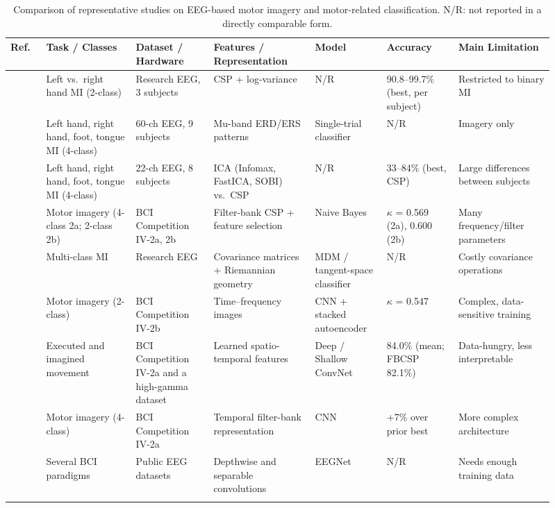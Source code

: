 \documentclass[pdflatex,sn-mathphys-num]{sn-jnl}%
\theoremstyle{thmstyleone}%
\theoremstyle{thmstyletwo}%
\theoremstyle{thmstylethree}%
\begin{document}
\begin{table}[t]
\centering
\caption{Comparison of representative studies on EEG-based motor imagery and motor-related classification. N/R: not reported in a directly comparable form.}
\label{tab:litreview}
\footnotesize
\setlength{\tabcolsep}{2.5pt}
\begin{tabular}{@{}p{0.06\linewidth}p{0.15\linewidth}p{0.13\linewidth}p{0.17\linewidth}p{0.12\linewidth}p{0.12\linewidth}p{0.16\linewidth}@{}}
\toprule
Ref. & Task / Classes & Dataset / Hardware & Features / Representation & Model & Accuracy & Main Limitation \\
\midrule
\cite{Ramoser2000} & Left vs.\ right hand MI (2-class) & Research EEG, 3 subjects & CSP + log-variance & N/R & 90.8--99.7\% (best, per subject) & Restricted to binary MI \\ \addlinespace
\cite{Pfurtscheller2006} & Left hand, right hand, foot, tongue MI (4-class) & 60-ch EEG, 9 subjects & Mu-band ERD/ERS patterns & Single-trial classifier & N/R & Imagery only \\ \addlinespace
\cite{Naeem2006} & Left hand, right hand, foot, tongue MI (4-class) & 22-ch EEG, 8 subjects & ICA (Infomax, FastICA, SOBI) vs.\ CSP & N/R & 33--84\% (best, CSP) & Large differences between subjects \\ \addlinespace
\cite{Ang2012} & Motor imagery (4-class 2a; 2-class 2b) & BCI Competition IV-2a, 2b & Filter-bank CSP + feature selection & Naive Bayes & $\kappa$ = 0.569 (2a), 0.600 (2b) & Many frequency/filter parameters \\ \addlinespace
\cite{Barachant2012} & Multi-class MI & Research EEG & Covariance matrices + Riemannian geometry & MDM / tangent-space classifier & N/R & Costly covariance operations \\ \addlinespace
\cite{Tabar2017} & Motor imagery (2-class) & BCI Competition IV-2b & Time--frequency images & CNN + stacked autoencoder & $\kappa$ = 0.547 & Complex, data-sensitive training \\ \addlinespace
\cite{Schirrmeister2017} & Executed and imagined movement & BCI Competition IV-2a and a high-gamma dataset & Learned spatio-temporal features & Deep / Shallow ConvNet & 84.0\% (mean; FBCSP 82.1\%) & Data-hungry, less interpretable \\ \addlinespace
\cite{Sakhavi2018} & Motor imagery (4-class) & BCI Competition IV-2a & Temporal filter-bank representation & CNN & +7\% over prior best & More complex architecture \\ \addlinespace
\cite{Lawhern2018} & Several BCI paradigms & Public EEG datasets & Depthwise and separable convolutions & EEGNet & N/R & Needs enough training data \\ \addlinespace

\end{tabular}
\end{table}
\end{document}
